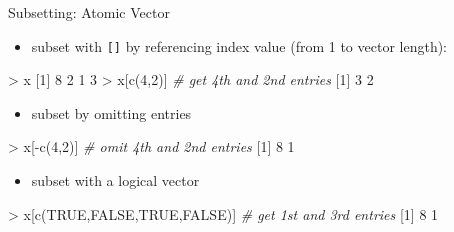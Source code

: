 \documentclass[
  ignorenonframetext,
]{beamer}
\newenvironment{Shaded}{\begin{snugshade}}{\end{snugshade}}
\newcommand{\CommentTok}[1]{\textcolor[rgb]{0.56,0.35,0.01}{\textit{#1}}}
\newcommand{\ConstantTok}[1]{\textcolor[rgb]{0.00,0.00,0.00}{#1}}
\newcommand{\DecValTok}[1]{\textcolor[rgb]{0.00,0.00,0.81}{#1}}
\newcommand{\FunctionTok}[1]{\textcolor[rgb]{0.00,0.00,0.00}{#1}}
\newcommand{\NormalTok}[1]{#1}
\newcommand{\SpecialCharTok}[1]{\textcolor[rgb]{0.00,0.00,0.00}{#1}}
\providecommand{\tightlist}{%
  \setlength{\itemsep}{0pt}\setlength{\parskip}{0pt}}
\begin{document}
\begin{frame}[fragile]{Subsetting: Atomic Vector}
\protect\hypertarget{subsetting-atomic-vector}{}
\begin{itemize}[<+->]
\tightlist
\item
  subset with \texttt{{[}{]}} by referencing index value (from 1 to
  vector length):
\end{itemize}

\begin{Shaded}
\begin{Highlighting}[]
\SpecialCharTok{\textgreater{}}\NormalTok{ x}
\NormalTok{[}\DecValTok{1}\NormalTok{] }\DecValTok{8} \DecValTok{2} \DecValTok{1} \DecValTok{3}
\SpecialCharTok{\textgreater{}}\NormalTok{ x[}\FunctionTok{c}\NormalTok{(}\DecValTok{4}\NormalTok{,}\DecValTok{2}\NormalTok{)]  }\CommentTok{\# get 4th and 2nd entries}
\NormalTok{[}\DecValTok{1}\NormalTok{] }\DecValTok{3} \DecValTok{2}
\end{Highlighting}
\end{Shaded}

\begin{itemize}[<+->]
\tightlist
\item
  subset by omitting entries
\end{itemize}

\begin{Shaded}
\begin{Highlighting}[]
\SpecialCharTok{\textgreater{}}\NormalTok{ x[}\SpecialCharTok{{-}}\FunctionTok{c}\NormalTok{(}\DecValTok{4}\NormalTok{,}\DecValTok{2}\NormalTok{)]  }\CommentTok{\# omit 4th and 2nd entries}
\NormalTok{[}\DecValTok{1}\NormalTok{] }\DecValTok{8} \DecValTok{1}
\end{Highlighting}
\end{Shaded}

\begin{itemize}[<+->]
\tightlist
\item
  subset with a logical vector
\end{itemize}

\begin{Shaded}
\begin{Highlighting}[]
\SpecialCharTok{\textgreater{}}\NormalTok{ x[}\FunctionTok{c}\NormalTok{(}\ConstantTok{TRUE}\NormalTok{,}\ConstantTok{FALSE}\NormalTok{,}\ConstantTok{TRUE}\NormalTok{,}\ConstantTok{FALSE}\NormalTok{)]  }\CommentTok{\# get 1st and 3rd entries}
\NormalTok{[}\DecValTok{1}\NormalTok{] }\DecValTok{8} \DecValTok{1}
\end{Highlighting}
\end{Shaded}
\end{frame}
\end{document}
